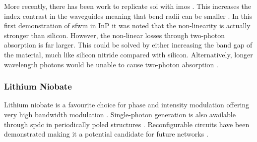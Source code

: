 More recently, there has been work to replicate \ac{soi} with \ac{imos} \cite{IMOS, van2011photonic}. This increases the index contrast in the waveguides meaning that bend radii can be smaller \cite{Kumar2019}. In this first demonstration of \ac{sfwm} in \ac{InP} it was noted that the non-linearity is actually stronger than silicon. However, the non-linear losses through two-photon absorption is far larger. This could be solved by either increasing the band gap of the material, much like silicon nitride compared with silicon. Alternatively, longer wavelength photons would be unable to cause two-photon absorption \cite{rosenfeld2019mid}. 









\subsubsection*{Lithium Niobate}

Lithium niobate is a favourite choice for phase and intensity modulation offering very high bandwidth modulation \cite{Louay2001Advances, Atsushi2010NRZ}. Single-photon generation is also available through \ac{spdc} in periodically poled structures \cite{tanzilli2002ppln}. Reconfigurable circuits have been demonstrated making it a potential candidate for future networks \cite{jin2014chip}. 


